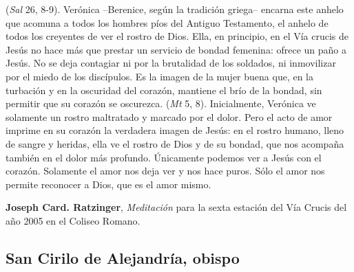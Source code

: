 \begin{patercite}
 (\textit{Sal} 26, 8-9). Verónica --Berenice, según la tradición griega-- encarna este anhelo que acomuna a todos los hombres píos del Antiguo Testamento, el anhelo de todos los creyentes de ver el rostro de Dios. Ella, en principio, en el Vía crucis de Jesús no hace más que prestar un servicio de bondad femenina: ofrece un paño a Jesús. No se deja contagiar ni por la brutalidad de los soldados, ni inmovilizar por el miedo de los discípulos. Es la imagen de la mujer buena que, en la turbación y en la oscuridad del corazón, mantiene el brío de la bondad, sin permitir que su corazón se oscurezca.  (\textit{Mt} 5, 8). Inicialmente, Verónica ve solamente un rostro maltratado y marcado por el dolor. Pero el acto de amor imprime en su corazón la verdadera imagen de Jesús: en el rostro humano, lleno de sangre y heridas, ella ve el rostro de Dios y de su bondad, que nos acompaña también en el dolor más profundo. Únicamente podemos ver a Jesús con el corazón. Solamente el amor nos deja ver y nos hace puros. Sólo el amor nos permite reconocer a Dios, que es el amor mismo.

\textbf{Joseph Card. Ratzinger}, \textit{Meditación} para la sexta estación del Vía Crucis del año 2005 en el Coliseo Romano. 
\end{patercite}

\newsection
\subsection{San Cirilo de Alejandría, obispo}



